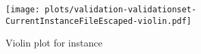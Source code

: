 \begin{figure}[hbtp]
   \centering
   \texttt{[image: plots/validation-validationset-\\CurrentInstanceFileEscaped-violin.pdf]}
   \caption{Violin plot for instance \CurrentInstance}
   \label{fig:\CurrentInstanceFileEscaped-violin}
\end{figure}

